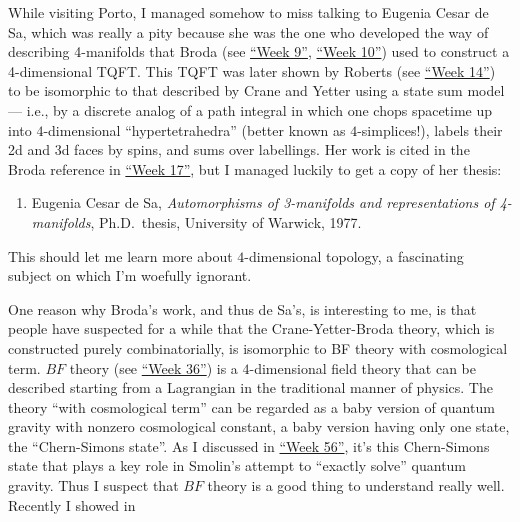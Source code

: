\documentclass{article}
\def\tightlist{}
\renewcommand{\texttt}[1]{%
  \begingroup
  \ttfamily
  \begingroup\lccode`~=`/\lowercase{\endgroup\def~}{/\discretionary{}{}{}}%
  \begingroup\lccode`~=`[\lowercase{\endgroup\def~}{[\discretionary{}{}{}}%
  \begingroup\lccode`~=`.\lowercase{\endgroup\def~}{.\discretionary{}{}{}}%
  \catcode`/=\active\catcode`[=\active\catcode`.=\active
  \scantokens{#1\noexpand}%
  \endgroup
}
\begin{document}
While visiting Porto, I managed somehow to miss talking to Eugenia Cesar
de Sa, which was really a pity because she was the one who developed the
way of describing 4-manifolds that Broda (see
\protect\hyperlink{week9}{``Week 9''}, \protect\hyperlink{week10}{``Week
10''}) used to construct a 4-dimensional TQFT. This TQFT was later shown
by Roberts (see \protect\hyperlink{week14}{``Week 14''}) to be
isomorphic to that described by Crane and Yetter using a state sum model
--- i.e., by a discrete analog of a path integral in which one chops
spacetime up into \(4\)-dimensional ``hypertetrahedra'' (better known as
\(4\)-simplices!), labels their 2d and 3d faces by spins, and sums over
labellings. Her work is cited in the Broda reference in
\protect\hyperlink{week17}{``Week 17''}, but I managed luckily to get a
copy of her thesis:

\begin{enumerate}
\def\labelenumi{\arabic{enumi})}
\setcounter{enumi}{3}
\tightlist
\item
  Eugenia Cesar de Sa, \emph{Automorphisms of 3-manifolds and
  representations of 4-manifolds}, Ph.D.~thesis, University of Warwick,
  1977.
\end{enumerate}

This should let me learn more about \(4\)-dimensional topology, a
fascinating subject on which I'm woefully ignorant.

One reason why Broda's work, and thus de Sa's, is interesting to me, is
that people have suspected for a while that the Crane-Yetter-Broda
theory, which is constructed purely combinatorially, is isomorphic to BF
theory with cosmological term. \(BF\) theory (see
\protect\hyperlink{week36}{``Week 36''}) is a \(4\)-dimensional field
theory that can be described starting from a Lagrangian in the
traditional manner of physics. The theory ``with cosmological term'' can
be regarded as a baby version of quantum gravity with nonzero
cosmological constant, a baby version having only one state, the
``Chern-Simons state''. As I discussed in
\protect\hyperlink{week56}{``Week 56''}, it's this Chern-Simons state
that plays a key role in Smolin's attempt to ``exactly solve'' quantum
gravity. Thus I suspect that \(BF\) theory is a good thing to understand
really well. Recently I showed in

\end{document}
